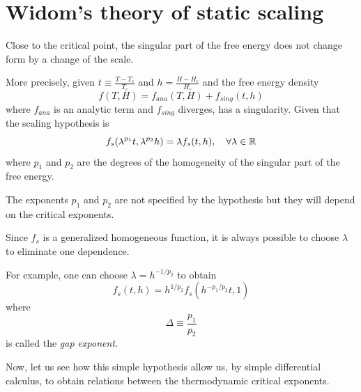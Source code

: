 \documentclass[../main/main.tex]{subfiles}
\begin{document}
\section{Widom's theory of static scaling}
Close to the critical point, the singular part of the free energy does not change form by a change of the scale.

More precisely, given \( t \equiv  \frac{T - T_c}{T_c}\) and \( h = \frac{H - H_c}{H_c} \) and the free energy density
\begin{equation}
  f (T,H) = f_{ana} (T,H) + f_{sing} (t,h)
\end{equation}
where \( f_{ana} \) is an analytic term and \( f_{sing} \) diverges, has a singularity. Given that the scaling hypothesis is
\begin{equation}
  f_s ( \lambda ^{p_1} t, \lambda ^{p_2} h) = \lambda f_s (t,h), \quad \forall \lambda \in \mathbb{R}
\end{equation}
where \( p_1 \) and \( p_2 \) are the degrees of the homogeneity of the singular part of the free energy.
\begin{remark}
The exponents \( p_1 \) and \( p_2 \)  are not specified by the hypothesis but they will depend on the critical exponents.
\end{remark}
\begin{remark}
Since \( f_s \) is a generalized homogeneous function, it is always possible to choose \( \lambda  \) to eliminate one dependence.

For example, one can choose \(   \lambda = h^{-1/p_2} \) to obtain
\begin{equation}
 f_s (t,h) = h^{1/p_2} f_s (h^{-p_1/p_2} t , 1)
\end{equation}
where
\begin{equation}
  \Delta  \equiv \frac{p_1}{p_2}
\end{equation}
is called the \emph{gap exponent}.
\end{remark}

Now, let us see how this simple hypothesis allow us, by simple differential calculus, to obtain relations between the thermodynamic critical exponents.
\end{document}
